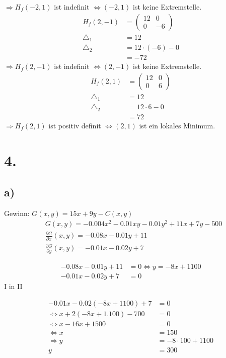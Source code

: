 \documentclass[a4paper]{scrartcl}
\begin{document}
\(\Rightarrow H_f(-2,1)\) ist indefinit \(\Leftrightarrow (-2,1)\) ist keine Extremstelle. \\
\begin{align}
H_f(2,-1) &= \begin{pmatrix}
12 & 0 \\
0 & -6
\end{pmatrix} \\
\triangle_1 &= 12 \\
\triangle_2 &= 12 \cdot (-6) -0 \\
	&= -72 
\end{align}
\(\Rightarrow H_f(2,-1)\) ist indefinit \(\Leftrightarrow (2,-1)\) ist keine Extremstelle. \\
\begin{align}
H_f(2,1) &= \begin{pmatrix}
12 & 0 \\
0 & 6
\end{pmatrix} \\
\triangle_1 &= 12 \\
\triangle_2 &= 12 \cdot 6 -0 \\
	&= 72 
\end{align}
\(\Rightarrow H_f(2,1)\) ist positiv definit \(\Leftrightarrow (2,1)\) ist ein lokales Minimum. \\


\newpage
\section{4.}
\subsection{a)}
Gewinn: \(G(x,y) = 15x + 9y - C(x,y) \) \\
\begin{align}
&G(x,y) = -0.004x^2 - 0.01xy - 0.01y^2 + 11x + 7y - 500 \\
&\frac {\partial G} {\partial x} (x,y) = -0.08x - 0.01y + 11 \\
&\frac {\partial G} {\partial y} (x,y) = -0.01x - 0.02y + 7
\end{align}

\begin{align}
-0.08x - 0.01y + 11 &= 0 \Leftrightarrow y = -8x + 1100 \\
-0.01x - 0.02y + 7 &= 0
\end{align}
I in II

\begin{align}
-0.01x - 0.02(-8x+1100) + 7 &= 0 \\
\Leftrightarrow x + 2(-8x+1.100) - 700 &= 0 \\
\Leftrightarrow x - 16x + 1500 &=0\\
\Leftrightarrow x &= 150 \\
\Rightarrow y &= -8 \cdot 100 + 1100 \\
y &= 300
\end{align}
\end{document}
